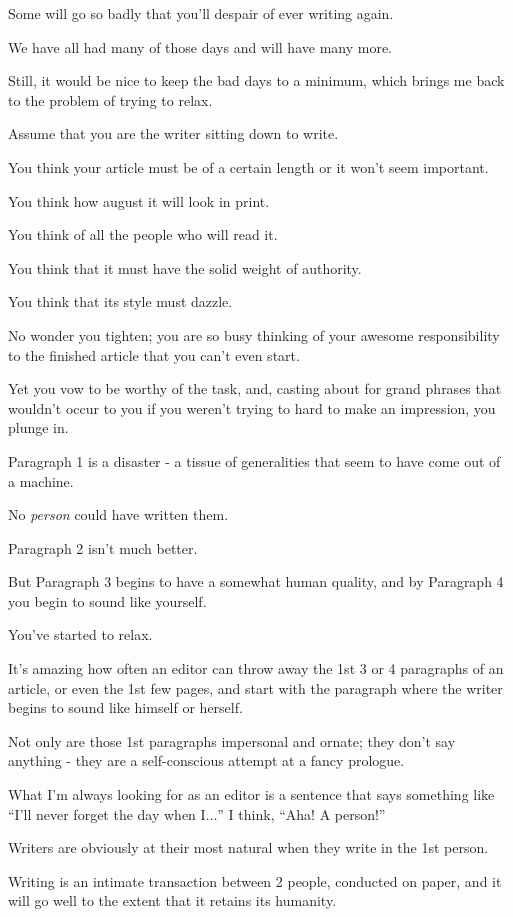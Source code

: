 \documentclass{book}
\numberwithin{equation}{section}
\begin{document}
Some will go so badly that you'll despair of ever writing again.

We have all had many of those days and will have many more.

%
Still, it would be nice to keep the bad days to a minimum, which brings me back to the problem of trying to relax.

%
Assume that you are the writer sitting down to write.

You think your article must be of a certain length or it won't seem important.

You think how august it will look in print.

You think of all the people who will read it.

You think that it must have the solid weight of authority.

You think that its style must dazzle.

No wonder you tighten; you are so busy thinking of your awesome responsibility to the finished article that you can't even start.

Yet you vow to be worthy of the task, and, casting about for grand phrases that wouldn't occur to you if you weren't trying to hard to make an impression, you plunge in.

%
Paragraph 1 is a disaster - a tissue of generalities that seem to have come out of a machine.

No \textit{person} could have written them.

Paragraph 2 isn't much better.

But Paragraph 3 begins to have a somewhat human quality, and by Paragraph 4 you begin to sound like yourself.

You've started to relax.

It's amazing how often an editor can throw away the 1st 3 or 4 paragraphs of an article, or even the 1st few pages, and start with the paragraph where the writer begins to sound like himself or herself.

Not only are those 1st paragraphs impersonal and ornate; they don't say anything - they are a self-conscious attempt at a fancy prologue.

What I'm always looking for as an editor is a sentence that says something like ``I'll never forget the day when I$\ldots$'' I think, ``Aha! A person!''

%
Writers are obviously at their most natural when they write in the 1st person.

Writing is an intimate transaction between 2 people, conducted on paper, and it will go well to the extent that it retains its humanity.
\end{document}
